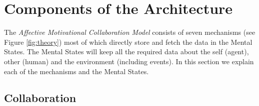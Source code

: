 \documentclass[12pt]{report}
\begin{document}
\section{Components of the Architecture}
\label{sec:architecture-components}

The \textit{Affective Motivational Collaboration Model} consists of seven
mechanisms (see Figure \ref{fig:theory}) most of which directly store and fetch
the data in the Mental States. The Mental States will keep all the required data
about the self (agent), other (human) and the environment (including events). In
this section we explain each of the mechanisms and the Mental States.

\subsection{Collaboration}
\end{document}

